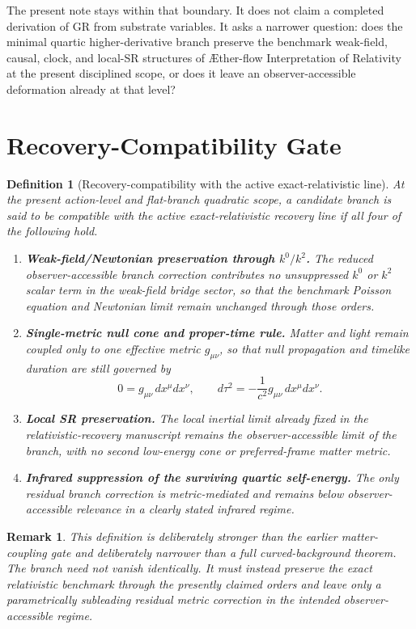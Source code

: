 \documentclass[11pt]{article}
\newcommand{\Aflow}{\AE{}ther-flow}
\newcommand{\TheoryName}{\Aflow{} Interpretation of Relativity}
\newtheorem{definition}{Definition}
\newtheorem{remark}{Remark}
\begin{document}
The present note stays within that boundary. It does not claim a completed derivation of GR from substrate variables. It asks a narrower question: does the minimal quartic higher-derivative branch preserve the benchmark weak-field, causal, clock, and local-SR structures of \TheoryName{} at the present disciplined scope, or does it leave an observer-accessible deformation already at that level?

\section{Recovery-Compatibility Gate}

\begin{definition}[Recovery-compatibility with the active exact-relativistic line]
At the present action-level and flat-branch quadratic scope, a candidate branch is said to be compatible with the active exact-relativistic recovery line if all four of the following hold.
\begin{enumerate}
    \item \textbf{Weak-field/Newtonian preservation through \(k^0/k^2\).} The reduced observer-accessible branch correction contributes no unsuppressed \(k^0\) or \(k^2\) scalar term in the weak-field bridge sector, so that the benchmark Poisson equation and Newtonian limit remain unchanged through those orders.
    \item \textbf{Single-metric null cone and proper-time rule.} Matter and light remain coupled only to one effective metric \(g_{\mu\nu}\), so that null propagation and timelike duration are still governed by
    \begin{equation}
    0=g_{\mu\nu}\,dx^\mu dx^\nu,
    \qquad
    d\tau^2=-\frac{1}{c^2}g_{\mu\nu}\,dx^\mu dx^\nu.
    \label{eq:nullproper}
    \end{equation}
    \item \textbf{Local SR preservation.} The local inertial limit already fixed in the relativistic-recovery manuscript remains the observer-accessible limit of the branch, with no second low-energy cone or preferred-frame matter metric.
    \item \textbf{Infrared suppression of the surviving quartic self-energy.} The only residual branch correction is metric-mediated and remains below observer-accessible relevance in a clearly stated infrared regime.
\end{enumerate}
\end{definition}

\begin{remark}
This definition is deliberately stronger than the earlier matter-coupling gate and deliberately narrower than a full curved-background theorem. The branch need not vanish identically. It must instead preserve the exact relativistic benchmark through the presently claimed orders and leave only a parametrically subleading residual metric correction in the intended observer-accessible regime.
\end{remark}
\end{document}
